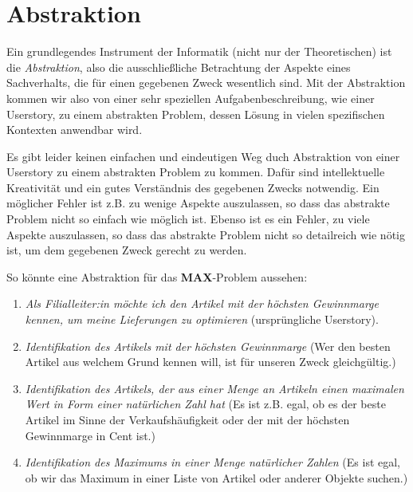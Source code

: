 \section{Abstraktion}

Ein grundlegendes Instrument der Informatik (nicht nur der Theoretischen) 
ist die \emph{Abstraktion}, also die ausschließliche Betrachtung der Aspekte eines Sachverhalts,
die für einen gegebenen Zweck wesentlich sind.
Mit der Abstraktion kommen wir also von einer sehr speziellen Aufgabenbeschreibung,
wie einer Userstory, zu einem abstrakten Problem,
dessen Lösung in vielen spezifischen Kontexten anwendbar wird.

Es gibt leider keinen einfachen und eindeutigen Weg
duch Abstraktion von einer Userstory zu einem abstrakten Problem zu kommen.
Dafür sind intellektuelle Kreativität und ein gutes Verständnis des gegebenen Zwecks notwendig.
Ein möglicher Fehler ist z.B. zu wenige Aspekte auszulassen,
so dass das abstrakte Problem nicht so einfach wie möglich ist. 
Ebenso ist es ein Fehler, zu viele Aspekte auszulassen,
so dass das abstrakte Problem nicht so detailreich wie nötig ist,
um dem gegebenen Zweck gerecht zu werden.


\noindent
So könnte eine Abstraktion für das \textbf{MAX}-Problem aussehen:
\begin{enumerate}
    \item \emph{Als Filialleiter:in möchte ich den Artikel mit der höchsten Gewinnmarge kennen,
        um meine Lieferungen zu optimieren} (ursprüngliche Userstory).
    \item \emph{Identifikation des Artikels mit der höchsten Gewinnmarge}
        (Wer den besten Artikel aus welchem Grund kennen will,
        ist für unseren Zweck gleichgültig.)
    \item \emph{Identifikation des Artikels,
        der aus einer Menge an Artikeln einen maximalen Wert in Form einer natürlichen Zahl hat}
        (Es ist z.B. egal,
        ob es der beste Artikel im Sinne der Verkaufshäufigkeit
        oder der mit der höchsten Gewinnmarge in Cent ist.)
    \item \emph{Identifikation des Maximums in einer Menge natürlicher Zahlen}
        (Es ist egal, ob wir das Maximum in einer Liste von Artikel oder anderer Objekte suchen.)
\end{enumerate}

